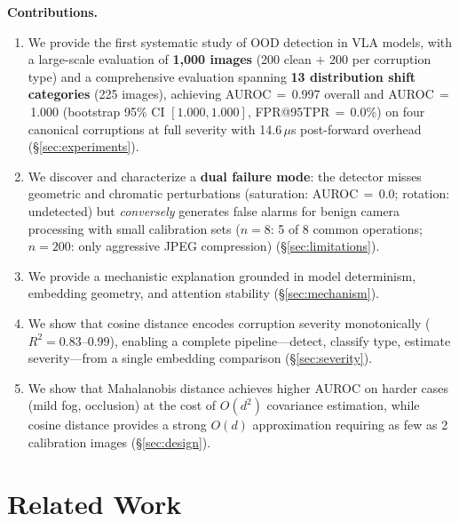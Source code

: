 \documentclass[11pt]{article}
\begin{document}
\textbf{Contributions.}
\begin{enumerate}
    \item We provide the first systematic study of OOD detection in VLA models, with a large-scale evaluation of \textbf{1,000 images} (200 clean $+$ 200 per corruption type) and a comprehensive evaluation spanning \textbf{13 distribution shift categories} (225 images), achieving AUROC\,$=$\,0.997 overall and AUROC\,$=$\,1.000 (bootstrap 95\% CI $[1.000, 1.000]$, FPR@95TPR\,$=$\,0.0\%) on four canonical corruptions at full severity with 14.6\,$\mu$s post-forward overhead (\S\ref{sec:experiments}).
    \item We discover and characterize a \textbf{dual failure mode}: the detector misses geometric and chromatic perturbations (saturation: AUROC\,$=$\,0.0; rotation: undetected) but \emph{conversely} generates false alarms for benign camera processing with small calibration sets ($n{=}8$: 5 of 8 common operations; $n{=}200$: only aggressive JPEG compression) (\S\ref{sec:limitations}).
    \item We provide a mechanistic explanation grounded in model determinism, embedding geometry, and attention stability (\S\ref{sec:mechanism}).
    \item We show that cosine distance encodes corruption severity monotonically ($R^2 = 0.83$--$0.99$), enabling a complete pipeline---detect, classify type, estimate severity---from a single embedding comparison (\S\ref{sec:severity}).
    \item We show that Mahalanobis distance achieves higher AUROC on harder cases (mild fog, occlusion) at the cost of $O(d^2)$ covariance estimation, while cosine distance provides a strong $O(d)$ approximation requiring as few as 2 calibration images (\S\ref{sec:design}).
\end{enumerate}

\section{Related Work}
\label{sec:related}
\end{document}
